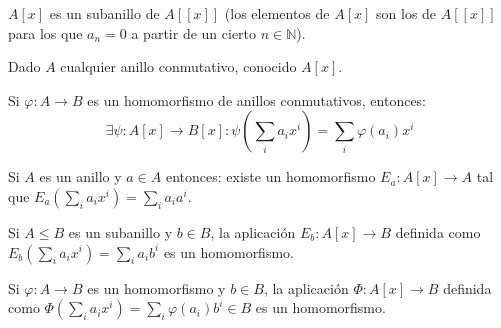 $A[x]$ es un subanillo de $A[[x]]$ (los elementos de $A[x]$ son los de $A[[x]]$ para los que $a_n = 0$ a partir de un cierto $n\in \mathbb{N}$).

\begin{nprop}
 Dado $A$ cualquier anillo conmutativo, conocido $A[x]$.

 Si $\varphi:A \to B$ es un homomorfismo de anillos conmutativos, entonces:
 \[
 \exists \psi: A[x] \to B[x] : \psi\left(\sum_i a_i x^i\right) = \sum_i\varphi(a_i) x^i
 \]


\end{nprop}

\begin{nprop}

Si $A$ es un anillo y $a \in A$ entonces: existe un homomorfismo $E_a: A[x] \to A$ tal que $E_a(\sum_i a_i x^i) = \sum_i a_i a^i$.

\end{nprop}

\begin{nprop}[3]
Si $A \leq B$ es un subanillo y $b\in B$, la aplicación $E_b:A[x] \to B$ definida como $E_b(\sum_i a_i x^i) = \sum_i a_i b^i$ es un homomorfismo.

\end{nprop}

\begin{nprop}
Si $\varphi:A \to B$ es un homomorfismo y $b\in B$, la aplicación $\Phi:A[x] \to B$ definida como $\Phi ( \sum_i a_i x^i) = \sum_i \varphi(a_i)b^i \in B$ es un homomorfismo.

\end{nprop}

